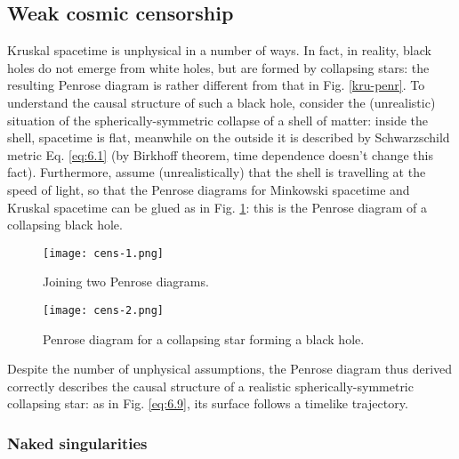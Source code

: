\subsection{Weak cosmic censorship}

Kruskal spacetime is unphysical in a number of ways. In fact, in reality, black holes do not emerge from white holes, but are formed by collapsing stars: the resulting Penrose diagram is rather different from that in Fig. \ref{kru-penr}. To understand the causal structure of such a black hole, consider the (unrealistic) situation of the spherically-symmetric collapse of a shell of matter: inside the shell, spacetime is flat, meanwhile on the outside it is described by Schwarzschild metric Eq. \ref{eq:6.1} (by Birkhoff theorem, time dependence doesn't change this fact). Furthermore, assume (unrealistically) that the shell is travelling at the speed of light, so that the Penrose diagrams for Minkowski spacetime and Kruskal spacetime can be glued as in Fig. \ref{cens-1}: this is the Penrose diagram of a collapsing black hole.

\begin{figure}
  \centering
  \texttt{[image: cens-1.png]}
  \caption{Joining two Penrose diagrams.}
  \label{cens-1}
\end{figure}

\begin{figure}[b]
  \centering
  \texttt{[image: cens-2.png]}
  \caption{Penrose diagram for a collapsing star forming a black hole.}
  \label{cens-2}
\end{figure}

Despite the number of unphysical assumptions, the Penrose diagram thus derived correctly describes the causal structure of a realistic spherically-symmetric collapsing star: as in Fig. \ref{eq:6.9}, its surface follows a timelike trajectory.

\subsubsection{Naked singularities}

